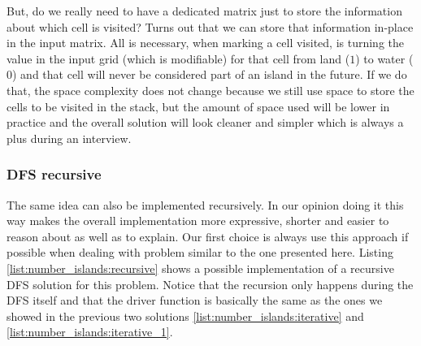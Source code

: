But, do we really need to have a dedicated matrix just to store the information about which cell is visited?
Turns out that we can store that information in-place in the input matrix. All is necessary, when marking a cell visited, is turning
the value in the input grid (which is modifiable) for that cell from land ($1$) to water ($0$) and that cell will never be considered part
of an island in the future. If we do that, the space complexity does not change because we still use
space to store the cells to be visited in the stack,
but the amount of space used will be lower in practice and the overall solution will look cleaner and simpler which is always a plus during an
interview. 



\subsubsection{DFS recursive}
\label{sec:num_island:recursive}
The same idea can also be implemented recursively. In our opinion doing it this way makes the
overall implementation more expressive, shorter and easier to reason about as well as to explain. Our first choice is always 
use this approach if possible when dealing with problem similar to the one presented here.
Listing \ref{list:number_islands:recursive} shows a possible implementation of a recursive DFS solution for
this problem. 
Notice that the recursion only happens during the DFS itself and that the driver
function  is basically the same as the ones we showed in the
previous two solutions \ref{list:number_islands:iterative} and
\ref{list:number_islands:iterative_1}.

